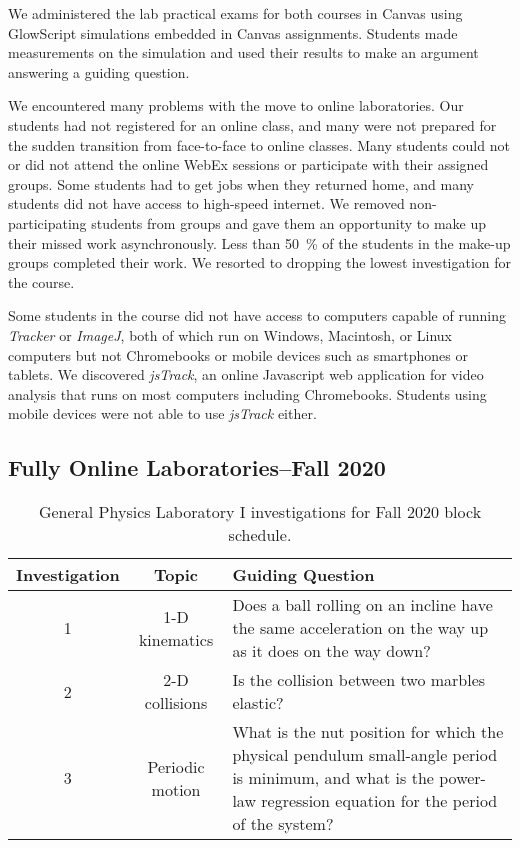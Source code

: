\documentclass[aip, numerical, preprint]{revtex4-2}
\begin{document}
We administered the lab practical exams for both courses in Canvas using GlowScript simulations
embedded in Canvas assignments. Students made measurements on the simulation and used their
results to make an argument answering a guiding question.

We encountered many problems with the move to online laboratories. Our students had not
registered for an online class, and many were not prepared for the sudden transition from
face-to-face to online classes. Many students could not or did not attend the online WebEx
sessions or participate with their assigned groups. Some students had to get jobs when they
returned home, and many students did not have access to high-speed internet. We removed
non-participating students from groups and gave them an opportunity to make up their missed
work asynchronously. Less than \SI{50}{\percent} of the students in the make-up groups
completed their work. We resorted to dropping the lowest investigation for the course.

Some students in the course did not have access to computers capable of running \emph{Tracker}
or \emph{ImageJ}, both of which run on Windows, Macintosh, or Linux computers but not
Chromebooks or mobile devices such as smartphones or tablets. We discovered
\emph{jsTrack}\citep{jstrack}, an online Javascript web application for video analysis that
runs on most computers including Chromebooks. Students using mobile devices were not able to
use \emph{jsTrack} either.

\subsection{Fully Online Laboratories--Fall 2020}

\begin{table}
  \caption{\label{tab: 1251 fall} General Physics Laboratory I investigations for Fall 2020
    block schedule.}
  \begin{tabular}{ccp{28em}}
    \hline\hline
    Investigation & Topic & Guiding Question\\
    \hline
    1 & 1-D kinematics & Does a ball rolling on an incline have the same acceleration on the way up as it does on the way down? \\
    2 & 2-D collisions & Is the collision between two marbles elastic? \\
    3 & Periodic motion & What is the nut position for which the physical pendulum small-angle period is minimum, and what is the power-law regression equation for the period of the system? \\
    \hline\hline
  \end{tabular}
\end{table}
\end{document}
